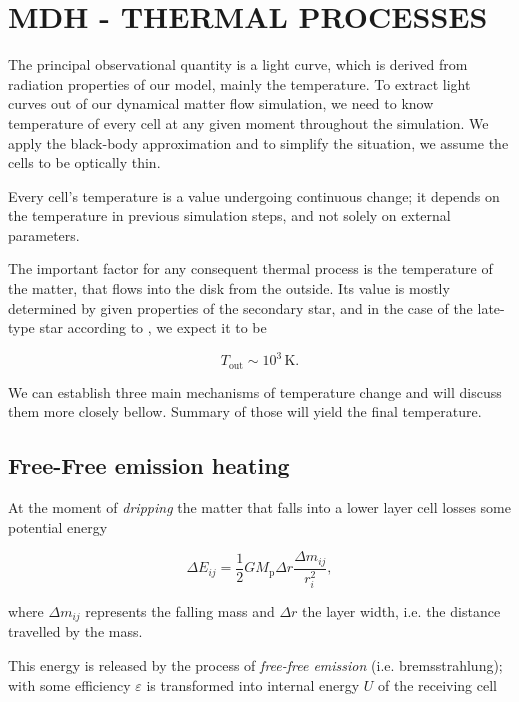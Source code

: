 \chapter{MDH - THERMAL PROCESSES}
\label{chap:thermal_processes}
\thispagestyle{empty}

The principal observational quantity is a light curve, which is derived from radiation properties of our model, mainly the temperature. To extract light curves out of our dynamical matter flow simulation, we need to know temperature of every cell at any given moment throughout the simulation. We apply the black-body approximation and to simplify the situation, we assume the cells to be optically thin. 

Every cell's temperature is a value undergoing continuous change; it depends on the temperature in previous simulation steps, and not solely on external parameters.

The important factor for any consequent thermal process is the temperature of the matter, that flows into the disk from the outside. Its value is mostly determined by given properties of the secondary star, and in the case of the late-type star according to \cite{allen1973}, we expect it to be

\begin{equation}
T_{\text{out}} \sim 10^3\, \mathrm{K}.
\end{equation}

We can establish three main mechanisms of temperature change and will discuss them more closely bellow. Summary of those will yield the final temperature. 

\section{Free-Free emission heating}

At the moment of \emph{dripping} the matter that falls into a lower layer cell losses some potential energy \cite{yonehara1997} 

\begin{equation}
   \Delta E_{ij} = \frac{1}{2} G M_{\text{p}} \Delta r \frac{\Delta m_{ij}}{r_i^2},
   \label{eq:e_pot}
\end{equation}

where $\Delta m_{ij}$ represents the falling mass and $\Delta r$ the layer width, i.e. the distance travelled by the mass. 

This energy is released by the process of \emph{free-free emission} (i.e. bremsstrahlung); with some efficiency $\varepsilon$ is transformed into internal energy $U$ of the receiving cell

